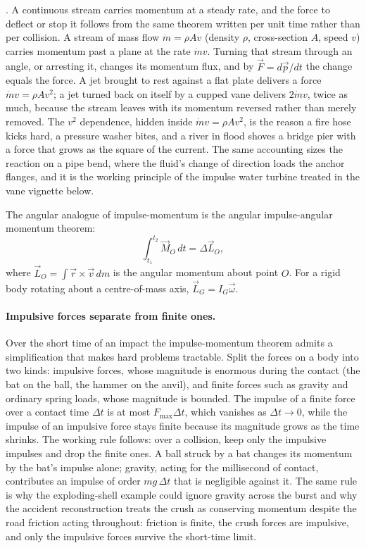 . A continuous stream carries momentum at
a steady rate, and the force to deflect or stop it follows from the same
theorem written per unit time rather than per collision. A stream of
mass flow $\dot{m}=\rho A v$ (density $\rho$, cross-section $A$, speed
$v$) carries momentum past a plane at the rate $\dot{m}v$. Turning that
stream through an angle, or arresting it, changes its momentum flux, and
by $\vec{F}=d\vec{p}/dt$ the change equals the force. A jet brought to
rest against a flat plate delivers a force $\dot{m}v=\rho A v^{2}$; a jet
turned back on itself by a cupped vane delivers $2\dot{m}v$, twice as
much, because the stream leaves with its momentum reversed rather than
merely removed. The $v^{2}$ dependence, hidden inside $\dot{m}v=\rho A
v^{2}$, is the reason a fire hose kicks hard, a pressure washer bites,
and a river in flood shoves a bridge pier with a force that grows as the
square of the current. The same accounting sizes the reaction on a
pipe bend, where the fluid's change of direction loads the anchor
flanges, and it is the working principle of the impulse water turbine
treated in the vane vignette below.

The angular analogue of impulse-momentum is the angular impulse-angular
momentum theorem:
\[
\int_{t_1}^{t_2} \vec{M}_O \,dt = \Delta \vec{L}_O,
\]
where $\vec{L}_O = \int \vec{r} \times \vec{v} \,dm$ is the angular
momentum about point $O$. For a rigid body rotating about a
centre-of-mass axis, $\vec{L}_G = I_G \vec{\omega}$.

\paragraph{Impulsive forces separate from finite ones.} Over the short
time of an impact the impulse-momentum theorem admits a simplification
that makes hard problems tractable. Split the forces on a body into two
kinds: impulsive forces, whose magnitude is enormous during the contact
(the bat on the ball, the hammer on the anvil), and finite forces such as
gravity and ordinary spring loads, whose magnitude is bounded. The
impulse of a finite force over a contact time $\Delta t$ is at most
$F_{\max}\Delta t$, which vanishes as $\Delta t\to 0$, while the impulse
of an impulsive force stays finite because its magnitude grows as the
time shrinks. The working rule follows: over a collision, keep only the
impulsive impulses and drop the finite ones. A ball struck by a bat
changes its momentum by the bat's impulse alone; gravity, acting for the
millisecond of contact, contributes an impulse of order $mg\,\Delta t$
that is negligible against it. The same rule is why the exploding-shell
example could ignore gravity across the burst and why the accident
reconstruction treats the crush as conserving momentum despite the road
friction acting throughout: friction is finite, the crush forces are
impulsive, and only the impulsive forces survive the short-time limit.

